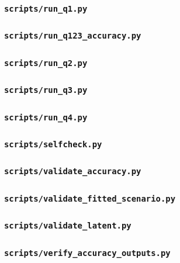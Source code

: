 \subsubsection*{\texttt{scripts/run\_q1.py}}

\subsubsection*{\texttt{scripts/run\_q123\_accuracy.py}}

\subsubsection*{\texttt{scripts/run\_q2.py}}

\subsubsection*{\texttt{scripts/run\_q3.py}}

\subsubsection*{\texttt{scripts/run\_q4.py}}

\subsubsection*{\texttt{scripts/selfcheck.py}}

\subsubsection*{\texttt{scripts/validate\_accuracy.py}}

\subsubsection*{\texttt{scripts/validate\_fitted\_scenario.py}}

\subsubsection*{\texttt{scripts/validate\_latent.py}}

\subsubsection*{\texttt{scripts/verify\_accuracy\_outputs.py}}

